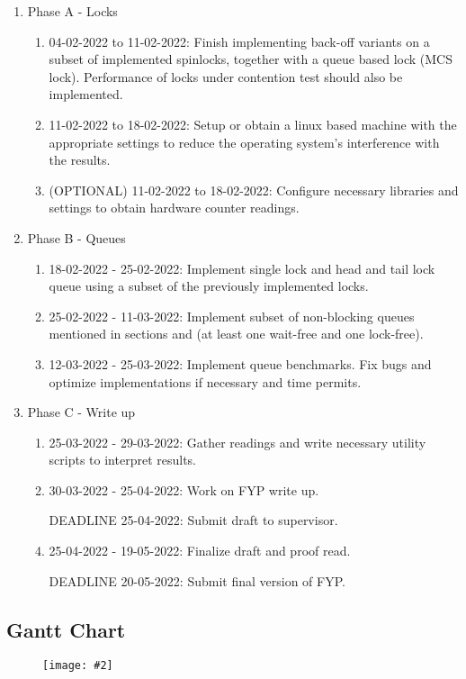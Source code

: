 \documentclass[a4paper, 12pt, titlepage]{article}
\newcommand{\image}[4]{
  \begin{figure}[H]
    \centerline{\texttt{[image: \#2]}}
    \captionof{figure}{#3}
    \label{fig: #4}
  \end{figure}
}
\begin{document}
\begin{onehalfspacing}
\begin{enumerate}
  \item Phase A - Locks
  \begin{enumerate}
    \item 04-02-2022 to 11-02-2022: Finish implementing back-off variants on a subset of implemented spinlocks, together with a queue based lock (MCS lock). Performance of locks under contention test should also be implemented.
    \item 11-02-2022 to 18-02-2022: Setup or obtain a linux based machine with the appropriate settings to reduce the operating system's interference with the results.
  \item (OPTIONAL) 11-02-2022 to 18-02-2022: Configure necessary libraries and settings to obtain hardware counter readings.
  \end{enumerate}
  \item Phase B - Queues
  \begin{enumerate}
    \item 18-02-2022 - 25-02-2022: Implement single lock and head and tail lock queue using a subset of the previously implemented locks.
    \item 25-02-2022 - 11-03-2022: Implement subset of non-blocking queues mentioned in sections  and  (at least one wait-free and one lock-free).
    \item 12-03-2022 - 25-03-2022: Implement queue benchmarks. Fix bugs and optimize implementations if necessary and time permits.
  \end{enumerate}
  \item Phase C - Write up
  \begin{enumerate}
    \item 25-03-2022 - 29-03-2022: Gather readings and write necessary utility scripts to interpret results.
    \item 30-03-2022 - 25-04-2022: Work on FYP write up.
    \item [DEADLINE]25-04-2022: Submit draft to supervisor.
    \item 25-04-2022 - 19-05-2022: Finalize draft and proof read.
  \item [DEADLINE]20-05-2022: Submit final version of FYP.
  \end{enumerate}
\end{enumerate}

\subsection{Gantt Chart}
\image{0.5}{gantt_chart.png}{Gantt chart}{gantt}



\end{onehalfspacing}
\end{document}
